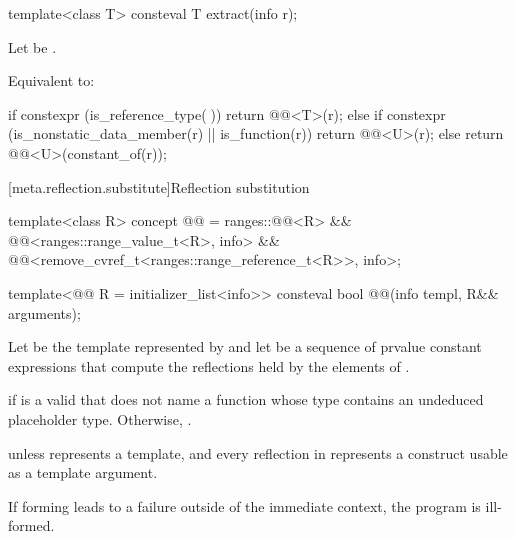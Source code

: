 %
\begin{itemdecl}
template<class T>
  consteval T extract(info r);
\end{itemdecl}

\begin{itemdescr}
\pnum
Let  be .

\pnum
\effects
Equivalent to:
\begin{codeblock}
if constexpr (is_reference_type(^^T)) {
  return @@<T>(r);
} else if constexpr (is_nonstatic_data_member(r) || is_function(r)) {
  return @@<U>(r);
} else {
  return @@<U>(constant_of(r));
}
\end{codeblock}
\end{itemdescr}

[meta.reflection.substitute]{Reflection substitution}

\begin{itemdecl}
template<class R>
concept @@ =
  ranges::@@<R> &&
  @@<ranges::range_value_t<R>, info> &&
  @@<remove_cvref_t<ranges::range_reference_t<R>>, info>;

template<@@ R = initializer_list<info>>
consteval bool @@(info templ, R&& arguments);
\end{itemdecl}

\begin{itemdescr}
\pnum
Let  be the template represented by 
and let  be a sequence of prvalue constant expressions
that compute the reflections held by the elements of .

\pnum
\returns
{} if  is a valid 
that does not name a function
whose type contains an undeduced placeholder type.
Otherwise, .

\pnum
\throws
{} unless
 represents a template,
and every reflection in  represents a construct
usable as a template argument.

\pnum
\begin{note}
If forming  leads to a failure
outside of the immediate context,
the program is ill-formed.
\end{note}
\end{itemdescr}

